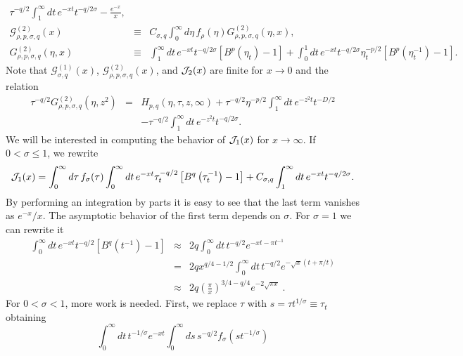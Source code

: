 \documentclass[a4paper,12pt]{article}
\begin{document}
{\begin{eqnarray}
  \tau^{-q/2} \int_1^\infty dt\, e^{-xt} t^{-q/2\sigma}
  - \frac{e^{-x}}{x} ,
\nonumber \\
\mathcal{G}_{\rho,p,\sigma,q}^{(2)}(x) &\equiv&
   C_{\sigma,q} \int_0^\infty d\eta\, f_\rho(\eta) 
   G_{\rho,p,\sigma,q}^{(2)}(\eta,x),
\\
G_{\rho,p,\sigma,q}^{(2)}(\eta,x) &\equiv&
       \int_{1}^\infty dt\, e^{-x t } t^{-q/2\sigma}
\left[   B^p\left( \eta_t \right) -1\right]   +
\int_{0}^1 dt\, e^{-x t } t^{-q/2\sigma} \eta_t^{-p/2} 
      \left[B^p\left( \eta_t^{-1} \right)-1\right] .
\nonumber 
\end{eqnarray}
Note that $\mathcal{G}_{\sigma,q}^{(1)}(x)$, 
$\mathcal{G}_{\rho,p,\sigma,q}^{(2)}(x)$, and ${\cal J}_2(x)$
are finite for $x\rightarrow 0$ and the relation
\begin{eqnarray}
\tau^{-q/2} G_{\rho,p,\sigma,q}^{(2)}(\eta,z^2) &=& 
 H_{p,q}(\eta,\tau,z,\infty) + 
 \tau^{-q/2} \eta^{-p/2} \int_1^\infty dt\, e^{-z^2 t} t^{-D/2} 
\nonumber \\
  && - \tau^{-q/2} \int_1^\infty dt\, e^{-z^2 t} t^{-q/2\sigma}.
\label{relation-G2-H}
\end{eqnarray}
We will be interested in computing the behavior of 
${\cal J}_1(x)$ for $x\to\infty$. If $0<\sigma\le 1$, we rewrite
\begin{equation}
{\cal J}_1(x) = \int_0^\infty d\tau\, f_\sigma(\tau) 
\int_{0}^\infty dt\, e^{-x t } \tau_t^{-q/2}
      \left[B^q\left( \tau_t^{-1} \right)-1\right] +
  C_{\sigma,q} \int_1^\infty dt\, e^{-xt} t^{-q/2\sigma} .
\end{equation}
By performing an integration by parts it is easy to see that the last
term vanishes as $e^{-x}/x$. The asymptotic behavior of the first term 
depends on $\sigma$. 
For $\sigma = 1$ we can rewrite it
\begin{eqnarray}
\int_{0}^\infty dt\, e^{-x t } t^{-q/2}
      \left[B^q\left( t^{-1} \right)-1\right]  &\approx&
      2q \int_{0}^\infty dt\, t^{-q/2}
      e^{-xt - \pi t^{-1}}
\nonumber       \\ 
& = & 2q x^{q/4-1/2} \int_{0}^{\infty} dt\, t^{-q/2} e^{-\sqrt{x}(t+\pi/t)} 
\nonumber  \\ 
&\approx & 2q \left(\frac{\pi}{x}\right)^{3/4-q/4} e^{-2\sqrt{\pi x}}\; .
\end{eqnarray}
For $0 < \sigma < 1$, more work is needed. First,
we replace $\tau$ with $s = \tau t^{1/\sigma}\equiv \tau_t$ obtaining
\begin{equation}
\int_0^\infty dt\, t^{-1/\sigma} e^{-x t }
\int_{0}^\infty ds\, s^{-q/2} f_\sigma(s t^{-1/\sigma})

\end{equation}}
\end{document}
